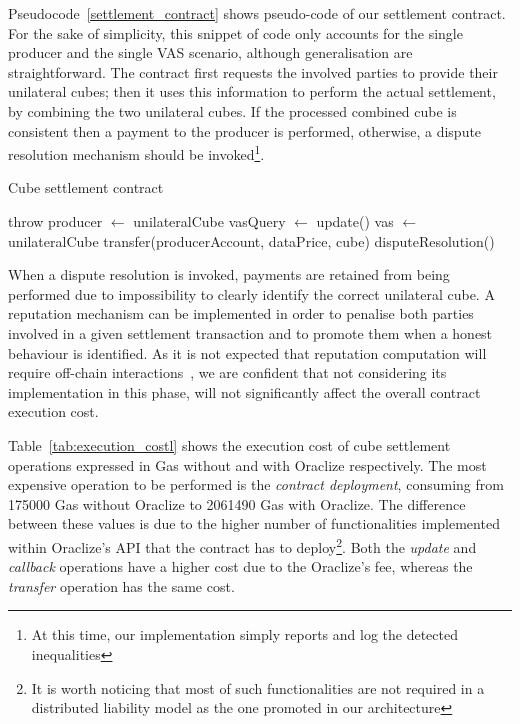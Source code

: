 \documentclass[chi_draft]{sigchi}
\begin{document}
{Pseudocode~\ref{settlement_contract} shows pseudo-code of our settlement contract. For the sake of simplicity, this snippet of code only accounts for the single producer and the single VAS scenario, although generalisation are straightforward.
The contract first requests the involved parties to provide their unilateral cubes; then it uses this information to perform the actual settlement, by combining the two unilateral cubes. If the processed combined cube is consistent then a payment to the producer is performed, otherwise, a dispute resolution mechanism should be invoked\footnote{At this time, our implementation simply reports and log the detected inequalities}.
%
\begin{algorithm}
	\caption{Cube settlement contract}\label{settlement_contract}
	\begin{algorithmic}
		\STATE throw
		\STATE producer $\gets$ unilateralCube
		\STATE vasQuery $\gets$ update()
		\STATE vas $\gets$ unilateralCube
		\STATE transfer(producerAccount, dataPrice, cube)
		\ELSE
		\STATE disputeResolution()
		\ENDIF
		\ENDIF
		\ENDIF
	\end{algorithmic}
\end{algorithm}
%
When a dispute resolution is invoked, payments are retained from being performed due to impossibility to clearly identify the correct unilateral cube. 
%
A reputation mechanism can be implemented in order to penalise both parties involved in a given settlement transaction and to promote them when a honest behaviour is identified. 
%
As it is not expected that reputation computation will require off-chain interactions~\cite{schaub2016trustless,carboni2015feedback}, we are confident that not considering its implementation in this phase, will not significantly affect the overall contract execution cost.

Table~\ref{tab:execution_costl} shows the execution cost of cube settlement operations expressed in Gas without and with Oraclize respectively. The most expensive operation to be performed is the \emph{contract deployment}, consuming from 175000 Gas without Oraclize to 2061490 Gas with Oraclize. The difference between these values is due to the higher number of functionalities implemented within Oraclize's API that the contract has to deploy\footnote{It is worth noticing that most of such functionalities are not required in a distributed liability model as the one promoted in our architecture}. Both the \emph{update} and \emph{callback} operations have a higher cost due to the Oraclize's fee, whereas the \emph{transfer} operation has the same cost.

}
\end{document}
